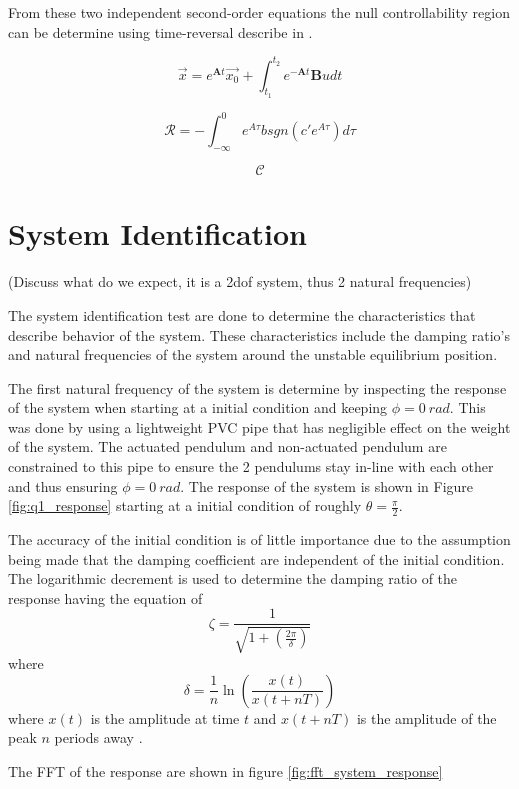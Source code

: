 \documentclass[a4paper,12pt]{article}
\begin{document}
	From these two independent second-order equations the null controllability region can be determine using time-reversal describe in \cite{null_controllability}.
	
	$$ \vec{x} = e^{\boldsymbol{A}t}\vec{x_{0}} + \int_{t_{1}}^{t_{2}} e^{-\boldsymbol{A}t}\boldsymbol{B}u dt $$ 
	
	$$\mathcal{R} = {-\int_{-\infty}^{0} e^{A\tau}bsgn(c'e^{A\tau})d\tau }  $$
	
	$$\mathcal{C} $$ 
	
	
	\section{System Identification}
	
	(Discuss what do we expect, it is a 2dof system, thus 2 natural frequencies)
	
	The system identification test are done to determine the characteristics that describe behavior of the system. These characteristics include the damping ratio's and natural frequencies of the system around the unstable equilibrium position.
	
	The first natural frequency of the system is determine by inspecting the response of the system when starting at a initial condition and keeping $\phi = \SI{0}{rad}$. This was done by using a lightweight PVC pipe that has negligible effect on the weight of the system. The actuated pendulum and non-actuated pendulum are constrained to this pipe to ensure the 2 pendulums stay in-line with each other and thus ensuring $\phi = \SI{0}{rad}$. The response of the system is shown in Figure \ref{fig:q1_response} starting at a initial condition of roughly $\theta = \frac{\pi}{2}$.
	
	The accuracy of the initial condition is of little importance due to the assumption being made that the damping coefficient are independent of the initial condition. The logarithmic decrement is used to determine the damping ratio of the response having the equation of $$ \zeta = \frac{1}{ \sqrt{1 + ( \frac{2 \pi}{\delta})}} $$ where $$ \delta  = \frac{1}{n} \ln( \frac{x(t)}{x(t+nT)}) $$ where $x(t)$ is the amplitude at time $t$ and $x(t+nT)$ is the amplitude of the peak $n$ periods away \cite{log_decrement}. 
	
	The FFT of the response are shown in figure \ref{fig:fft_system_response}
	
\end{document}
